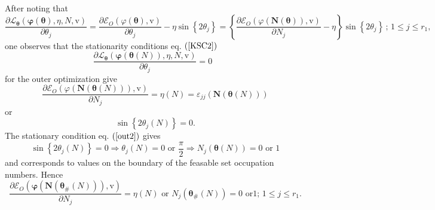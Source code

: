 \documentclass[aps,preprint]{revtex4}%
\begin{document}
After noting that
\begin{equation}
\frac{\partial\mathcal{L}_{\mathbf{\theta}}\left(  \mathbf{\varphi}\left(
\mathbf{\theta}\right)  ,\eta,N,\mathrm{v}\right)  }{\partial\theta_{j}}%
=\frac{\partial\mathcal{E}_{O}\left(  \varphi\left(  \mathbf{\theta}\right)
,\mathrm{v}\right)  }{\partial\theta_{j}}-\eta\sin\left\{  2\theta
_{j}\right\}  =\left\{  \frac{\partial\mathcal{E}_{O}\left(  \varphi\left(
\mathbf{N}\left(  \mathbf{\theta}\right)  \right)  ,\mathrm{v}\right)
}{\partial N_{j}}-\eta\right\}  \sin\left\{  2\theta_{j}\right\}  \,;\,1\leq
j\leq r_{1},
\end{equation}
one observes that the stationarity conditions eq. $\left(  \ref{KSC2}\right)
$
\begin{equation}
\frac{\partial\mathcal{L}_{\mathbf{\theta}}\left(  \mathbf{\varphi}\left(
\mathbf{\theta}\left(  N\right)  \right)  ,\eta\mathbf{,}N\mathbf{,}%
\mathrm{v}\right)  }{\partial\theta_{j}}=0\text{ }%
\end{equation}
for the outer optimization give%
\begin{equation}
\frac{\partial\mathcal{E}_{O}\left(  \varphi\left(  \mathbf{N}\left(
\mathbf{\theta}\left(  N\right)  \right)  \right)  ,\mathrm{v}\right)
}{\partial N_{j}}=\eta\left(  N\right)  =\varepsilon_{jj}\left(
\mathbf{\mathbf{N}}\left(  \mathbf{\theta}\left(  N\right)  \right)  \right)
\label{out1}%
\end{equation}
or%
\begin{equation}
\sin\left\{  2\theta_{j}\left(  N\right)  \right\}  =0. \label{out2}%
\end{equation}
The stationary condition eq. $\left(  \ref{out2}\right)  $ gives
\begin{equation}
\sin\left\{  2\theta_{j}\left(  N\right)  \right\}  =0\Rightarrow\theta
_{j}\left(  N\right)  =0\text{ or }\frac{\pi}{2}\Rightarrow N_{j}\left(
\mathbf{\theta}\left(  N\right)  \right)  =0\text{ or }1
\end{equation}
and corresponds to values on the boundary of the feasable set occupation
numbers. Hence
\begin{equation}
\frac{\partial\mathcal{E}_{O}\left(  \mathbf{\varphi}\left(  \mathbf{N}\left(
\mathbf{\theta}_{\#}\left(  N\right)  \right)  \right)  \mathbf{,}%
\mathrm{v}\right)  }{\partial N_{j}}=\eta\left(  N\right)  \text{ or }%
N_{j}\left(  \mathbf{\theta}_{\#}\left(  N\right)  \right)  =0\text{ or
}1;\,1\leq j\leq r_{1}.
\end{equation}
\end{document}

